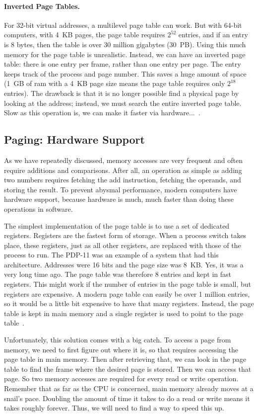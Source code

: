 \paragraph{Inverted Page Tables.} 
For 32-bit virtual addresses, a multilevel page table can work. But with 64-bit computers, with 4~KB pages, the page table requires $2^{52}$ entries, and if an entry is 8 bytes, then the table is over 30 million gigabytes (30~PB). Using this much memory for the page table is unrealistic. Instead, we can have an inverted page table: there is one entry per frame, rather than one entry per page. The entry keeps track of the process and page number. This saves a huge amount of space (1~GB of ram with a 4~KB page size means the page table requires only $2^{18}$ entries). The drawback is that it is no longer possible find a physical page by looking at the address; instead, we must search the entire inverted page table. Slow as this operation is, we can make it faster via hardware...~\cite{mos}.

\subsection*{Paging: Hardware Support}
As we have repeatedly discussed, memory accesses are very frequent and often require additions and comparisons. After all, an operation as simple as adding two numbers requires fetching the add instruction, fetching the operands, and storing the result. To prevent abysmal performance, modern computers have hardware support, because hardware is much, much faster than doing these operations in software.

The simplest implementation of the page table is to use a set of dedicated registers. Registers are the fastest form of storage. When a process switch takes place, these registers, just as all other registers, are replaced with those of the process to run. The PDP-11 was an example of a system that had this architecture. Addresses were 16 bits and the page size was 8~KB. Yes, it was a very long time ago. The page table was therefore 8 entries and kept in fast registers. This might work if the number of entries in the page table is small, but registers are expensive. A modern page table can easily be over 1 million entries, so it would be a little bit expensive to have that many registers. Instead, the page table is kept in main memory and a single register is used to point to the page table~\cite{osc}.

Unfortunately, this solution comes with a big catch. To access a page from memory, we need to first figure out where it is, so that requires accessing the page table in main memory. Then after retrieving that, we can look in the page table to find the frame where the desired page is stored. Then we can access that page. So two memory accesses are required for every read or write operation. Remember that as far as the CPU is concerned, main memory already moves at a snail's pace. Doubling the amount of time it takes to do a read or write means it takes roughly forever. Thus, we will need to find a way to speed this up.

